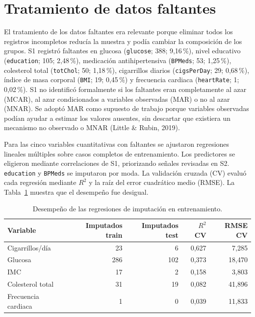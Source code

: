 \documentclass[10pt,a4paper]{article}
\newcommand{\compacttable}{\small\renewcommand{\arraystretch}{1.12}}
\begin{document}
\section{Tratamiento de datos faltantes}

El tratamiento de los datos faltantes era relevante porque eliminar todos los registros incompletos reducía la muestra y podía cambiar la composición de los grupos. S1 registró faltantes en glucosa (\texttt{glucose}; 388; 9,16\,\%), nivel educativo (\texttt{education}; 105; 2,48\,\%), medicación antihipertensiva (\texttt{BPMeds}; 53; 1,25\,\%), colesterol total (\texttt{totChol}; 50; 1,18\,\%), cigarrillos diarios (\texttt{cigsPerDay}; 29; 0,68\,\%), índice de masa corporal (\texttt{BMI}; 19; 0,45\,\%) y frecuencia cardiaca (\texttt{heartRate}; 1; 0,02\,\%). S1 no identificó formalmente si los faltantes eran completamente al azar (MCAR), al azar condicionados a variables observadas (MAR) o no al azar (MNAR). Se adoptó MAR como supuesto de trabajo porque variables observadas podían ayudar a estimar los valores ausentes, sin descartar que existiera un mecanismo no observado o MNAR (Little \& Rubin, 2019).

Para las cinco variables cuantitativas con faltantes se ajustaron regresiones lineales múltiples sobre casos completos de entrenamiento. Los predictores se eligieron mediante correlaciones de S1, priorizando señales revisadas en S2. \texttt{education} y \texttt{BPMeds} se imputaron por moda. La validación cruzada (CV) evaluó cada regresión mediante $R^2$ y la raíz del error cuadrático medio (RMSE). La Tabla~\ref{tab:imputacion} muestra que el desempeño fue desigual.

\begin{table}[htbp]
\centering
\caption{Desempeño de las regresiones de imputación en entrenamiento.}
\label{tab:imputacion}
\compacttable
\begin{tabular}{lrrrr}
\toprule
Variable & Imputados train & Imputados test & $R^2$ CV & RMSE CV \\
\midrule
Cigarrillos/día & 23 & 6 & 0,627 & 7,285 \\
Glucosa & 286 & 102 & 0,373 & 18,470 \\
IMC & 17 & 2 & 0,158 & 3,803 \\
Colesterol total & 31 & 19 & 0,082 & 41,896 \\
Frecuencia cardiaca & 1 & 0 & 0,039 & 11,833 \\
\bottomrule
\end{tabular}
\end{table}
\end{document}
